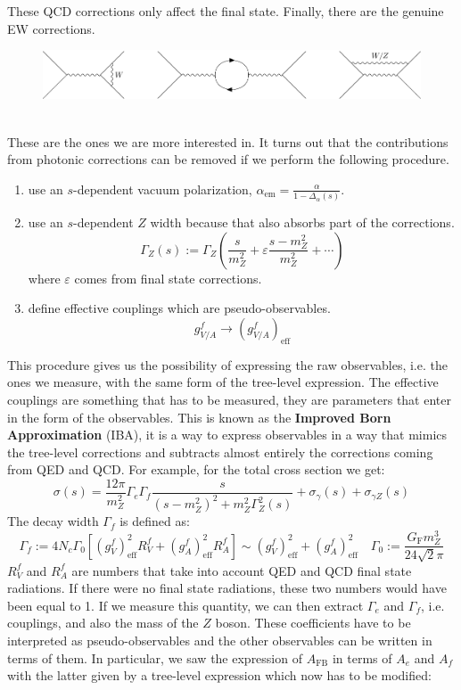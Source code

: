 \documentclass[../main.tex]{subfiles}
\begin{document}
These QCD corrections only affect the final state. Finally, there are the genuine EW corrections.
\begin{figure}[h]
    \centering
    \includegraphics{Images/corr3.pdf}
    \caption*{}
\end{figure}\\
These are the ones we are more interested in. It turns out that the contributions from photonic corrections can be removed if we perform the following procedure.
\begin{enumerate}[label=\roman*)]
    \item use an $s$-dependent vacuum polarization, $\alpha_{\text{em}}=\frac{\alpha}{1-\Delta_\alpha(s)}$.
    \item use an $s$-dependent $Z$ width because that also absorbs part of the corrections.
    \[
    \Gamma_Z(s):=\Gamma_Z\left(\frac{s}{m_Z^2}+\varepsilon\frac{s-m_Z^2}{m_Z^2}+\cdots\right)
    \]
    where $\varepsilon$ comes from final state corrections.
    \item define effective couplings which are pseudo-observables.
    \[
    g_{V/A}^f\to(g_{V/A}^f)_{\text{eff}}
    \]
\end{enumerate}
This procedure gives us the possibility of expressing the raw observables, i.e. the ones we measure, with the same form of the tree-level expression. The effective couplings are something that has to be measured, they are parameters that enter in the form of the observables. This is known as the \textbf{Improved Born Approximation} (IBA), it is a way to express observables in a way that mimics the tree-level corrections and subtracts almost entirely the corrections coming from QED and QCD. For example, for the total cross section we get:
\[
\sigma(s)=\frac{12\pi}{m_Z^2}\Gamma_e\Gamma_f\frac{s}{(s-m_Z^2)^2+m_Z^2\Gamma_Z^2(s)}+\sigma_\gamma(s)+\sigma_{\gamma Z}(s)
\]
The decay width $\Gamma_f$ is defined as:
\[
\Gamma_f:=4N_c\Gamma_0\left[(g_V^f)^2_{\text{eff}}R_V^f+(g_A^f)^2_{\text{eff}}R_A^f\right]\sim(g_V^f)_{\text{eff}}^2+(g_A^f)_{\text{eff}}^2 \quad \Gamma_0:=\frac{G_{\text{F}}m_Z^3}{24\sqrt{2}\pi}
\]
$R_V^f$ and $R_A^f$ are numbers that take into account QED and QCD final state radiations. If there were no final state radiations, these two numbers would have been equal to 1. If we measure this quantity, we can then extract $\Gamma_e$ and $\Gamma_f$, i.e. couplings, and also the mass of the $Z$ boson. These coefficients have to be interpreted as pseudo-observables and the other observables can be written in terms of them. In particular, we saw the expression of $A_{\text{FB}}$ in terms of $A_e$ and $A_f$ with the latter given by a tree-level expression which now has to be modified:
\end{document}
